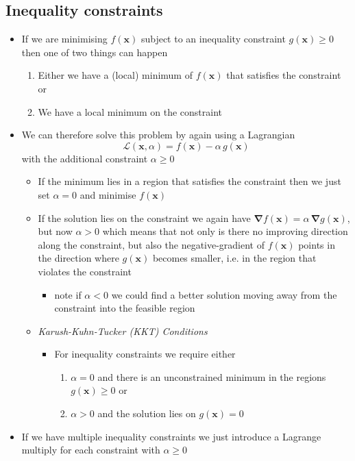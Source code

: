 \documentclass[11pt]{article}
\newcommand{\grad}{\bm{\nabla}}
\begin{document}
\subsection{Inequality constraints}
\label{sec:org7699c4a}
\begin{itemize}
\item If we are minimising \(f(\bm{x})\) subject to an inequality
constraint \(g(\bm{x})\geq0\) then one of two things can happen
\begin{enumerate}
\item Either we have a (local) minimum of \(f(\bm{x})\) that satisfies
the constraint or
\item We have a local minimum on the constraint
\end{enumerate}
\item We can therefore solve this problem by again using a Lagrangian
$$ \mathcal{L}(\bm{x},\alpha) = f(\bm{x}) - \alpha\,g(\bm{x}) $$
with the additional constraint \(\alpha\geq0\)
\begin{itemize}
\item If the minimum lies in a region that satisfies the constraint
then we just set \(\alpha=0\) and minimise \(f(\bm{x})\)
\item If the solution lies on the constraint we again have  \(\grad
       f(\bm{x}) = \alpha\,\grad g(\bm{x})\), but now \(\alpha>0\) which
means that not only is there no improving direction along the
constraint, but also the negative-gradient of \(f(\bm{x})\)
points in the direction where \(g(\bm{x})\) becomes smaller,
i.e. in the region that violates the constraint
\begin{itemize}
\item note if \(\alpha<0\) we could find a better solution moving
away from the constraint into the feasible region
\end{itemize}
\item \emph{Karush-Kuhn-Tucker (KKT) Conditions}
\begin{itemize}
\item For inequality constraints we require either
\begin{enumerate}
\item \(\alpha=0\) and there is an unconstrained minimum in the
regions \(g(\bm{x})\geq0\) or
\item \(\alpha>0\) and the solution lies on \(g(\bm{x})=0\)
\end{enumerate}
\end{itemize}
\end{itemize}
\item If we have multiple inequality constraints we just introduce a
Lagrange multiply for each constraint with \(\alpha\geq0\)
\end{itemize}
\end{document}
